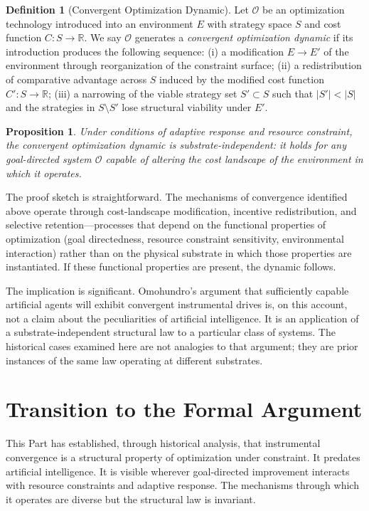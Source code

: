 \documentclass[12pt, oneside]{book}
\theoremstyle{plain}
\newtheorem{proposition}[theorem]{Proposition}
\theoremstyle{definition}
\newtheorem{definition}[theorem]{Definition}
\theoremstyle{remark}
\theoremstyle{definition}
\begin{document}
\begin{definition}[Convergent Optimization Dynamic]
Let $\mathcal{O}$ be an optimization technology introduced into an environment $E$
with strategy space $S$ and cost function $C: S \to \mathbb{R}$. We say $\mathcal{O}$
generates a \emph{convergent optimization dynamic} if its introduction produces the
following sequence: (i) a modification $E \to E'$ of the environment through
reorganization of the constraint surface; (ii) a redistribution of comparative
advantage across $S$ induced by the modified cost function $C': S \to \mathbb{R}$;
(iii) a narrowing of the viable strategy set $S' \subset S$ such that $|S'| < |S|$
and the strategies in $S \setminus S'$ lose structural viability under $E'$.
\end{definition}

\begin{proposition}
Under conditions of adaptive response and resource constraint, the convergent
optimization dynamic is substrate-independent: it holds for any goal-directed
system $\mathcal{O}$ capable of altering the cost landscape of the environment in
which it operates.
\end{proposition}

The proof sketch is straightforward. The mechanisms of convergence identified above
operate through cost-landscape modification, incentive redistribution, and selective
retention---processes that depend on the functional properties of optimization (goal
directedness, resource constraint sensitivity, environmental interaction) rather than
on the physical substrate in which those properties are instantiated. If these
functional properties are present, the dynamic follows.

The implication is significant. Omohundro's argument that sufficiently capable
artificial agents will exhibit convergent instrumental drives is, on this account,
not a claim about the peculiarities of artificial intelligence. It is an application
of a substrate-independent structural law to a particular class of systems. The
historical cases examined here are not analogies to that argument; they are prior
instances of the same law operating at different substrates.

\section{Transition to the Formal Argument}

This Part has established, through historical analysis, that instrumental convergence
is a structural property of optimization under constraint. It predates artificial
intelligence. It is visible wherever goal-directed improvement interacts with resource
constraints and adaptive response. The mechanisms through which it operates are
diverse but the structural law is invariant.
\end{document}
